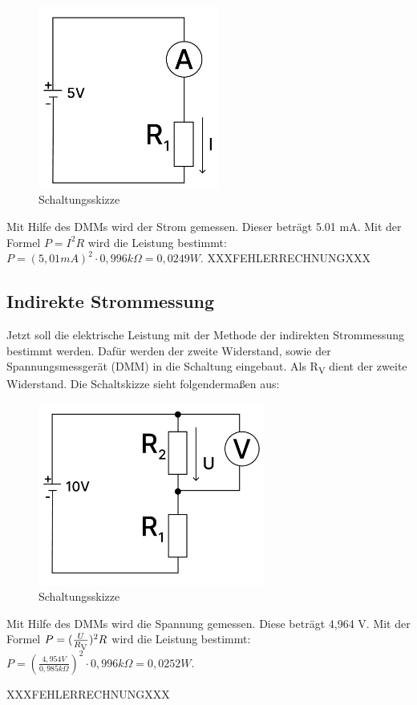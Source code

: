 \begin{figure}[H]
	\centering
	\includegraphics[height=6cm]{images/Versuch3/Versuch3_1_Schaltskizze.pdf} 
	\caption{Schaltungsskizze}
	\label{fig: Schaltungsskizze Versuch 3}
\end{figure}

Mit Hilfe des DMMs wird der Strom gemessen. Dieser beträgt 5.01 mA. Mit der
Formel $P = I^{2}R$ wird die Leistung bestimmt: $P=(5,01 mA)^{2}\cdot 0,996 k\Omega = 0,0249 W$.
XXXFEHLERRECHNUNGXXX

\subsection{Indirekte Strommessung}
Jetzt soll die elektrische Leistung mit der Methode der indirekten Strommessung
bestimmt werden. Dafür werden der zweite Widerstand, sowie der Spannungsmessgerät
(DMM) in die Schaltung eingebaut. Als R\textsubscript{V} dient der
zweite Widerstand. Die Schaltskizze sieht folgendermaßen aus:

\begin{figure}[H]
	\centering
	\includegraphics[height=6cm]{images/Versuch3/Versuch3_2_Schaltskizze.pdf} 
	\caption{Schaltungsskizze}
	\label{fig: Schaltungsskizze Versuch 3_2}
\end{figure}

Mit Hilfe des DMMs wird die Spannung gemessen. Diese beträgt 4,964 V. Mit der
Formel $P = (\frac{U}{R\textsubscript{V}})^{2}R$ wird die Leistung bestimmt: 
$P = (\frac{4,954 V}{0,985 k\Omega})^{2}\cdot 0,996k\Omega = 0,0252 W$.

XXXFEHLERRECHNUNGXXX
